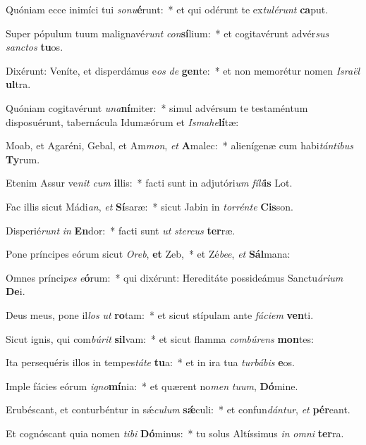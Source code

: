 \item Quóniam ecce inimíci tui \textit{so}\textit{nu}\textbf{é}runt:~* et qui odérunt te ex\textit{tu}\textit{lé}\textit{runt} \textbf{ca}put.
\item Super pópulum tuum malignavé\textit{runt} \textit{con}\textbf{sí}lium:~* et cogitavérunt advér\textit{sus} \textit{sanc}\textit{tos} \textbf{tu}os.
\item Dixérunt: Veníte, et disperdámus e\textit{os} \textit{de} \textbf{gen}te:~* et non memorétur nomen \textit{Is}\textit{ra}\textit{ël} \textbf{ul}tra.
\item Quóniam cogitavérunt \textit{u}\textit{na}\textbf{ní}miter:~* simul advérsum te testaméntum disposuérunt, tabernácula Idumæórum et \textit{Is}\textit{ma}\textit{he}\textbf{lí}tæ:
\item Moab, et Agaréni, Gebal, et Am\textit{mon}, \textit{et} \textbf{A}malec:~* alienígenæ cum habi\textit{tán}\textit{ti}\textit{bus} \textbf{Ty}rum.
\item Etenim Assur ve\textit{nit} \textit{cum} \textbf{il}lis:~* facti sunt in adjutóri\textit{um} \textit{fí}\textit{li}\textbf{is} Lot.
\item Fac illis sicut Mádi\textit{an}, \textit{et} \textbf{Sí}saræ:~* sicut Jabin in \textit{tor}\textit{rén}\textit{te} \textbf{Cis}son.
\item Disperié\textit{runt} \textit{in} \textbf{En}dor:~* facti sunt \textit{ut} \textit{ster}\textit{cus} \textbf{ter}ræ.
\item Pone príncipes eórum sicut \textit{O}\textit{reb}, \textbf{et} Zeb,~* et Zé\textit{be}\textit{e}, \textit{et} \textbf{Sál}mana:
\item Omnes prínci\textit{pes} \textit{e}\textbf{ó}rum:~* qui dixérunt: Hereditáte possideámus Sanctu\textit{á}\textit{ri}\textit{um} \textbf{De}i.
\item Deus meus, pone il\textit{los} \textit{ut} \textbf{ro}tam:~* et sicut stípulam ante \textit{fá}\textit{ci}\textit{em} \textbf{ven}ti.
\item Sicut ignis, qui com\textit{bú}\textit{rit} \textbf{sil}vam:~* et sicut flamma \textit{com}\textit{bú}\textit{rens} \textbf{mon}tes:
\item Ita persequéris illos in tempes\textit{tá}\textit{te} \textbf{tu}a:~* et in ira tua \textit{tur}\textit{bá}\textit{bis} \textbf{e}os.
\item Imple fácies eórum \textit{i}\textit{gno}\textbf{mí}nia:~* et quærent no\textit{men} \textit{tu}\textit{um}, \textbf{Dó}mine.
\item Erubéscant, et conturbéntur in sǽ\textit{cu}\textit{lum} \textbf{sǽ}culi:~* et confun\textit{dán}\textit{tur}, \textit{et} \textbf{pér}eant.
\item Et cognóscant quia nomen \textit{ti}\textit{bi} \textbf{Dó}minus:~* tu solus Altíssimus \textit{in} \textit{om}\textit{ni} \textbf{ter}ra.
